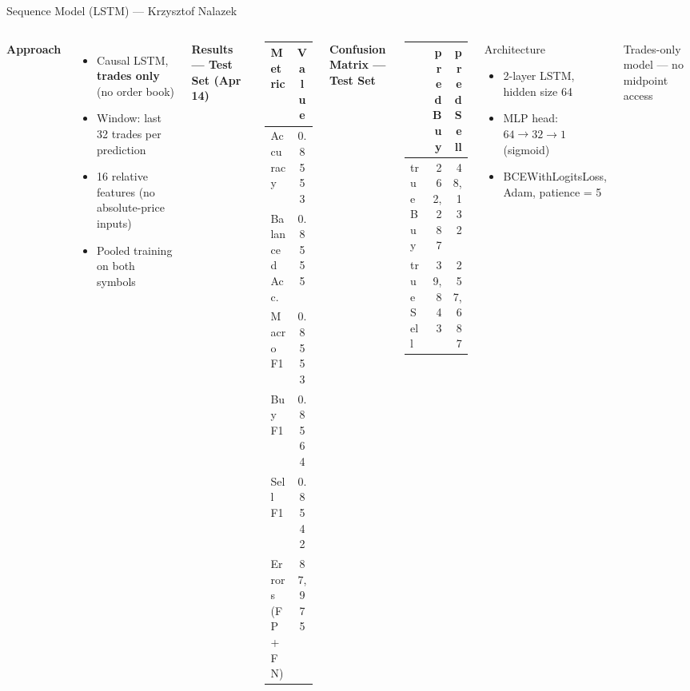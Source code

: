\documentclass[aspectratio=169,10pt]{beamer}
\begin{document}
\begin{frame}{Sequence Model (LSTM) — Krzysztof Nalazek}
  \begin{columns}[T]
    \textbf{Approach}
    \begin{itemize}
      \item Causal LSTM, \textbf{trades only} (no order book)
      \item Window: last 32 trades per prediction
      \item 16 relative features (no absolute-price inputs)
      \item Pooled training on both symbols
    \end{itemize}

    \medskip
    \textbf{Results — Test Set (Apr 14)}
    \begin{center}
    \begin{tabular}{lc}
      \toprule
      Metric & Value \\
      \midrule
      Accuracy       & 0.8553 \\
      Balanced Acc.  & 0.8555 \\
      Macro F1       & 0.8553 \\
      Buy F1         & 0.8564 \\
      Sell F1        & 0.8542 \\
      Errors (FP+FN) & 87{,}975 \\
      \bottomrule
    \end{tabular}
    \end{center}

    \textbf{Confusion Matrix — Test Set}
    \begin{center}
    \begin{tabular}{lrr}
      \toprule
       & pred Buy & pred Sell \\
      \midrule
      true Buy  & 262{,}287 & 48{,}132 \\
      true Sell & 39{,}843  & 257{,}687 \\
      \bottomrule
    \end{tabular}
    \end{center}

    \medskip
    \begin{block}{Architecture}
      \begin{itemize}
        \item 2-layer LSTM, hidden size 64
        \item MLP head: $64 \to 32 \to 1$ (sigmoid)
        \item BCEWithLogitsLoss, Adam, patience = 5
      \end{itemize}
    \end{block}

    \smallskip
    {\small \textcolor{badred}{Trades-only model — no midpoint access}}
  \end{columns}
\end{frame}
\end{document}
